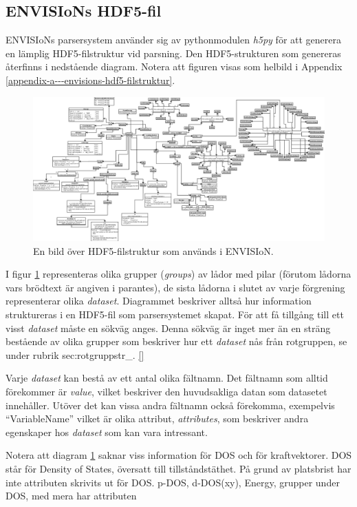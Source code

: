 \documentclass[10pt,oneside,swedish]{article}
\begin{document}
\subsection{ENVISIoNs HDF5-fil}\label{envisions-hdf5-fil}

ENVISIoNs parsersystem använder sig av pythonmodulen \emph{h5py} för att
generera en lämplig HDF5-filstruktur vid parsning. Den HDF5-strukturen
som genereras återfinns i nedstående diagram. Notera att figuren visas
som helbild i Appendix \ref{appendix-a---envisions-hdf5-filstruktur}.

\begin{figure}[H]
\centering
\includegraphics[width=1.00000\textwidth]{Images/UPDATE-hdf5-dataformat3modi.png}
\caption{En bild över HDF5-filstruktur som används i ENVISIoN.}
\label{fig:ENVISIoNsHDF5}
\end{figure}

I figur \ref{fig:ENVISIoNsHDF5} representeras olika grupper
(\emph{groups}) av lådor med pilar (förutom lådorna vars brödtext är
angiven i parantes), de sista lådorna i slutet av varje förgrening
representerar olika \emph{dataset}. Diagrammet beskriver alltså hur
information struktureras i en HDF5-fil som parsersystemet skapat. För
att få tillgång till ett visst \emph{dataset} måste en sökväg anges.
Denna sökväg är inget mer än en sträng bestående av olika grupper som
beskriver hur ett \emph{dataset} nås från rotgruppen, se under rubrik
sec:rotgruppstr\_. \ref{}

Varje \emph{dataset} kan bestå av ett antal olika fältnamn. Det fältnamn
som alltid förekommer är \emph{value}, vilket beskriver den huvudsakliga
datan som datasetet innehåller. Utöver det kan vissa andra fältnamn
också förekomma, exempelvis ``VariableName'' vilket är olika attribut,
\emph{attributes}, som beskriver andra egenskaper hos \emph{dataset} som
kan vara intressant.

Notera att diagram \ref{fig:ENVISIoNsHDF5} saknar viss information för DOS och för kraftvektorer.
DOS står för Density of States, översatt till tillståndstäthet. På grund
av platsbrist har inte attributen skrivits ut för DOS. p-DOS, d-DOS(xy),
Energy, grupper under DOS, med mera har attributen
\end{document}
